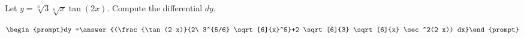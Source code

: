 \documentclass{ximera}
\author{Bart Snapp}
\begin{document}
\begin{exercise}

Let $y= \sqrt[6]{3} \sqrt[6]{x} \tan (2 x)$. Compute the differential $dy$.

\[
\begin{prompt}dy =\answer{(\frac{\tan (2 x)}{2\ 3^{5/6} \sqrt[6]{x}^5}+2 \sqrt[6]{3} \sqrt[6]{x} \sec ^2(2 x)) dx}\end{prompt}
\]
\end{exercise}
\end{document}
